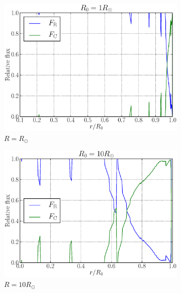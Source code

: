 \documentclass[a4paper, 11pt, english]{article}
\begin{document}
\begin{figure}[htpb]
	\begin{subfigure}{0.49\textwidth}
		\includegraphics[width=\linewidth]{figures/flux_Rsun.eps}
		\caption{$R = R_{\odot}$}
		\label{fig:flux_Rsun}
	\end{subfigure}\hfill
	\begin{subfigure}{0.49\textwidth}
		\includegraphics[width=\linewidth]{figures/flux_10Rsun.eps}
		\caption{$R = 10R_{\odot}$}
		\label{fig:flux_10Rsun}
	\end{subfigure}\hfill
	\vspace{0.35cm}
	\begin{subfigure}{0.49\textwidth}

\end{subfigure}
\end{figure}
\end{document}
